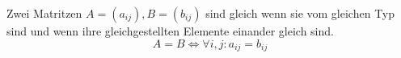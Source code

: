 Zwei Matritzen $A = (a_{ij}), B = (b_{ij})$ sind gleich wenn sie vom gleichen Typ sind und wenn ihre gleichgestellten Elemente einander gleich sind.
$$A = B \iff \forall i,j : a_{ij} = b_{ij}$$

